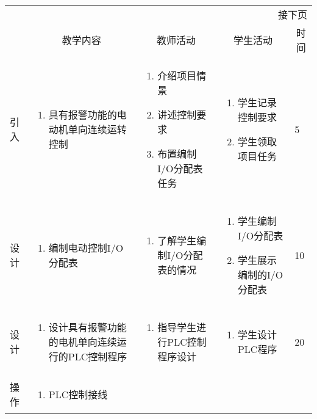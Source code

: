 {\begin{landscape}
\begin{longtable}{|m{10mm}|m{50mm}|m{50mm}|m{50mm}|m{15mm}|}
\multicolumn{5}{r}{\small 接下页}\\
\endfoot
\hline
\endlastfoot
\multicolumn{1}{|c|}{步骤}&\multicolumn{1}{c|}{教学内容}&\multicolumn{1}{c|}{教师活动}&\multicolumn{1}{c|}{学生活动}&\multicolumn{1}{c|}{时间}\\\hline
引入&\begin{enumerate}
\item 具有报警功能的电动机单向连续运转控制
\end{enumerate} &\begin{enumerate}
\item 介绍项目情景
\item 讲述控制要求
\item 布置编制I/O分配表任务
\end{enumerate} &\begin{enumerate}
\item 学生记录控制要求
\item 学生领取项目任务
\end{enumerate} &5 \\\hline
设计&
\begin{enumerate}
\item 编制电动控制I/O分配表
\end{enumerate} &\begin{enumerate}
\item 了解学生编制I/O分配表的情况
\end{enumerate} &\begin{enumerate}
\item 学生编制I/O分配表
\item 学生展示编制的I/O分配表
\end{enumerate} &10 \\\hline
设计&\begin{enumerate}
\item 设计具有报警功能的电机单向连续运行的PLC控制程序
\end{enumerate}
&\begin{enumerate}
\item 指导学生进行PLC控制程序设计
\end{enumerate} &\begin{enumerate}
\item 学生设计PLC程序
\end{enumerate} &20 \\\hline
操作&
\begin{enumerate}
\item PLC控制接线
\end{enumerate} &\begin{enumerate}

\end{enumerate}
\end{longtable}
\end{landscape}}
